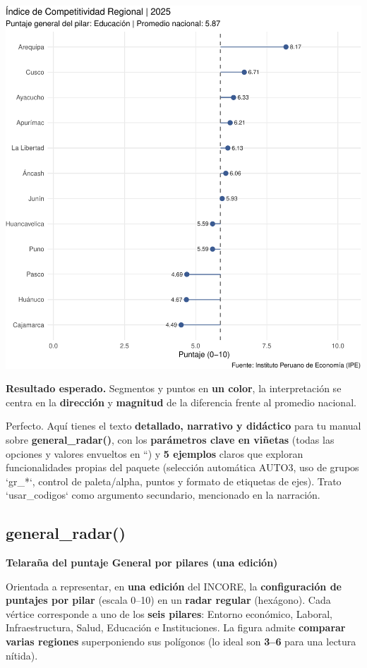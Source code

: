 \documentclass[
  11pt,
  letterpaper,
  DIV=11,
  numbers=noendperiod]{scrartcl}
\begin{document}
\includegraphics{Manual_files/figure-pdf/unnamed-chunk-51-1.pdf}

\textbf{Resultado esperado.} Segmentos y puntos en \textbf{un color}, la
interpretación se centra en la \textbf{dirección} y \textbf{magnitud} de
la diferencia frente al promedio nacional.

Perfecto. Aquí tienes el texto \textbf{detallado, narrativo y didáctico}
para tu manual sobre \textbf{general\_radar()}, con los
\textbf{parámetros clave en viñetas} (todas las opciones y valores
envueltos en ``) y \textbf{5 ejemplos} claros que exploran
funcionalidades propias del paquete (selección automática AUTO3, uso de
grupos `gr\_*`, control de paleta/alpha, puntos y formato de etiquetas
de ejes). Trato `usar\_codigos` como argumento secundario, mencionado en
la narración.

\subsection{\texorpdfstring{\textbf{general\_radar()}}{general\_radar()}}\label{general_radar}

\textbf{Telaraña del puntaje General por pilares (una edición)}

Orientada a representar, en \textbf{una edición} del INCORE, la
\textbf{configuración de puntajes por pilar} (escala 0--10) en un
\textbf{radar regular} (hexágono). Cada vértice corresponde a uno de los
\textbf{seis pilares}: Entorno económico, Laboral, Infraestructura,
Salud, Educación e Instituciones. La figura admite \textbf{comparar
varias regiones} superponiendo sus polígonos (lo ideal son \textbf{3--6}
para una lectura nítida).
\end{document}
